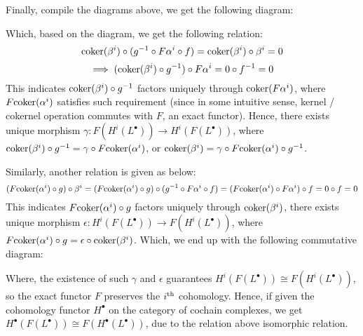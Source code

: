 \documentclass{article}
\newcommand{\coker}{\textmd{coker}}
\newcommand{\im}{\textmd{im}}
\newcommand{\Ker}{\textmd{Ker}}
\newcommand{\Imag}{\textmd{Im}} %
\begin{document}
Finally, compile the diagrams above, we get the following diagram:
\begin{center}
\end{center}
Which, based on the diagram, we get the following relation:
$$\coker(\beta^i)\circ (g^{-1}\circ F\alpha^i \circ f) = \coker(\beta^i)\circ \beta^i = 0$$
$$\implies (\coker(\beta^i)\circ g^{-1})\circ F\alpha^i = 0\circ f^{-1}=0$$
This indicates $\coker(\beta^i)\circ g^{-1}$ factors uniquely through $\coker(F\alpha^i)$, where $F\coker(\alpha^i)$ satisfies such requirement (since in some intuitive sense, kernel / cokernel operation commutes with $F$, an exact functor). Hence, there exists unique morphism $\gamma:F(H^i(L^\bullet))\rightarrow H^i(F(L^\bullet))$, where $\coker(\beta^i)\circ g^{-1} = \gamma\circ F\coker(\alpha^i)$, or $\coker(\beta^i)=\gamma\circ F\coker(\alpha^i)\circ g^{-1}$.

Similarly, another relation is given as below:
$$(F\coker(\alpha^i)\circ g)\circ \beta^i = (F\coker(\alpha^i)\circ g)\circ (g^{-1}\circ F\alpha^{i}\circ f) = (F\coker(\alpha^i)\circ F\alpha^i)\circ f = 0\circ f = 0$$
This indicates $F\coker(\alpha^i)\circ g$ factors uniquely through $\coker(\beta^i)$, there exists unique morphism $\epsilon:H^i(F(L^\bullet))\rightarrow F(H^i(L^\bullet))$, where $F\coker(\alpha^i)\circ g = \epsilon\circ \coker(\beta^i)$. Which, we end up with the following commutative diagram:
\begin{center}
\end{center}
Where, the existence of such $\gamma$ and $\epsilon$ guarantees $H^i(F(L^\bullet))\cong F(H^i(L^\bullet))$, so the exact functor $F$ preserves the $i^\textmd{th}$ cohomology. Hence, if given the cohomology functor $H^\bullet$ on the category of cochain complexes, we get $H^\bullet(F(L^\bullet))\cong F(H^\bullet(L^\bullet))$, due to the relation above isomorphic relation.
\end{document}

